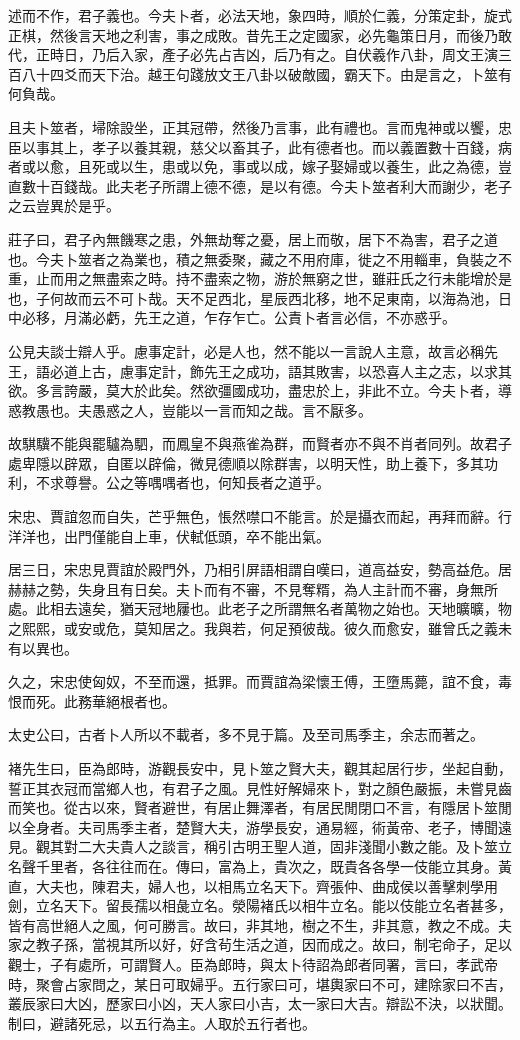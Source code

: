 述而不作，君子義也。今夫卜者，必法天地，象四時，順於仁義，分策定卦，旋式正棋，然後言天地之利害，事之成敗。昔先王之定國家，必先龜策日月，而後乃敢代，正時日，乃后入家，產子必先占吉凶，后乃有之。自伏羲作八卦，周文王演三百八十四爻而天下治。越王句踐放文王八卦以破敵國，霸天下。由是言之，卜筮有何負哉。

且夫卜筮者，埽除設坐，正其冠帶，然後乃言事，此有禮也。言而鬼神或以饗，忠臣以事其上，孝子以養其親，慈父以畜其子，此有德者也。而以義置數十百錢，病者或以愈，且死或以生，患或以免，事或以成，嫁子娶婦或以養生，此之為德，豈直數十百錢哉。此夫老子所謂上德不德，是以有德。今夫卜筮者利大而謝少，老子之云豈異於是乎。

莊子曰，君子內無饑寒之患，外無劫奪之憂，居上而敬，居下不為害，君子之道也。今夫卜筮者之為業也，積之無委聚，藏之不用府庫，徙之不用輜車，負裝之不重，止而用之無盡索之時。持不盡索之物，游於無窮之世，雖莊氏之行未能增於是也，子何故而云不可卜哉。天不足西北，星辰西北移，地不足東南，以海為池，日中必移，月滿必虧，先王之道，乍存乍亡。公責卜者言必信，不亦惑乎。

公見夫談士辯人乎。慮事定計，必是人也，然不能以一言說人主意，故言必稱先王，語必道上古，慮事定計，飾先王之成功，語其敗害，以恐喜人主之志，以求其欲。多言誇嚴，莫大於此矣。然欲彊國成功，盡忠於上，非此不立。今夫卜者，導惑教愚也。夫愚惑之人，豈能以一言而知之哉。言不厭多。

故騏驥不能與罷驢為駟，而鳳皇不與燕雀為群，而賢者亦不與不肖者同列。故君子處卑隱以辟眾，自匿以辟倫，微見德順以除群害，以明天性，助上養下，多其功利，不求尊譽。公之等喁喁者也，何知長者之道乎。

宋忠、賈誼忽而自失，芒乎無色，悵然噤口不能言。於是攝衣而起，再拜而辭。行洋洋也，出門僅能自上車，伏軾低頭，卒不能出氣。

居三日，宋忠見賈誼於殿門外，乃相引屏語相謂自嘆曰，道高益安，勢高益危。居赫赫之勢，失身且有日矣。夫卜而有不審，不見奪糈，為人主計而不審，身無所處。此相去遠矣，猶天冠地屨也。此老子之所謂無名者萬物之始也。天地曠曠，物之熙熙，或安或危，莫知居之。我與若，何足預彼哉。彼久而愈安，雖曾氏之義未有以異也。

久之，宋忠使匈奴，不至而還，抵罪。而賈誼為梁懷王傅，王墮馬薨，誼不食，毒恨而死。此務華絕根者也。

太史公曰，古者卜人所以不載者，多不見于篇。及至司馬季主，余志而著之。

褚先生曰，臣為郎時，游觀長安中，見卜筮之賢大夫，觀其起居行步，坐起自動，誓正其衣冠而當鄉人也，有君子之風。見性好解婦來卜，對之顏色嚴振，未嘗見齒而笑也。從古以來，賢者避世，有居止舞澤者，有居民閒閉口不言，有隱居卜筮閒以全身者。夫司馬季主者，楚賢大夫，游學長安，通易經，術黃帝、老子，博聞遠見。觀其對二大夫貴人之談言，稱引古明王聖人道，固非淺聞小數之能。及卜筮立名聲千里者，各往往而在。傳曰，富為上，貴次之，既貴各各學一伎能立其身。黃直，大夫也，陳君夫，婦人也，以相馬立名天下。齊張仲、曲成侯以善擊刺學用劍，立名天下。留長孺以相彘立名。滎陽褚氏以相牛立名。能以伎能立名者甚多，皆有高世絕人之風，何可勝言。故曰，非其地，樹之不生，非其意，教之不成。夫家之教子孫，當視其所以好，好含茍生活之道，因而成之。故曰，制宅命子，足以觀士，子有處所，可謂賢人。臣為郎時，與太卜待詔為郎者同署，言曰，孝武帝時，聚會占家問之，某日可取婦乎。五行家曰可，堪輿家曰不可，建除家曰不吉，叢辰家曰大凶，歷家曰小凶，天人家曰小吉，太一家曰大吉。辯訟不決，以狀聞。制曰，避諸死忌，以五行為主。人取於五行者也。
